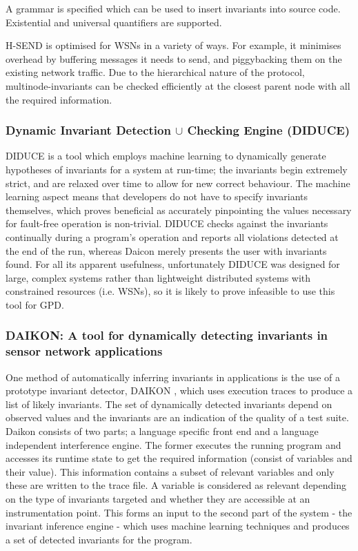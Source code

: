 A grammar is specified which can be used to insert invariants into source code. Existential and universal quantifiers are supported.

H-SEND is optimised for WSNs in a variety of ways. For example, it minimises overhead by buffering messages it needs to send, and piggybacking them on the existing network traffic. Due to the hierarchical nature of the protocol, multinode-invariants can be checked efficiently at the closest parent node with all the required information.

\subsubsection*{Dynamic Invariant Detection $\cup$ Checking Engine (DIDUCE)}

DIDUCE \cite{diduce} is a tool which employs machine learning to dynamically generate hypotheses of invariants for a system at run-time; the invariants begin extremely strict, and are relaxed over time to allow for new correct behaviour. The machine learning aspect means that developers do not have to specify invariants themselves, which proves beneficial as accurately pinpointing the values necessary for fault-free operation is non-trivial. DIDUCE checks against the invariants continually during a program's operation and reports all violations detected at the end of the run, whereas Daicon merely presents the user with invariants found. For all its apparent usefulness, unfortunately DIDUCE was designed for large, complex systems rather than lightweight distributed systems with constrained resources (i.e. WSNs), so it is likely to prove infeasible to use this tool for GPD.

\subsubsection*{DAIKON: A tool for dynamically detecting invariants in sensor network applications}

One method of automatically inferring invariants in applications is the use of a prototype invariant detector, DAIKON \cite{daikon}, which uses execution traces to produce a list of likely invariants. The set of dynamically detected invariants depend on observed values and the invariants are an indication of the quality of a test suite. Daikon consists of two parts; a language specific front end and a language independent interference engine. The former executes the running program and accesses its runtime state to get the required information (consist of variables and their value). This information contains a subset of relevant variables and only these are written to the trace file. A variable is considered as relevant depending on the type of invariants targeted and whether they are accessible at an instrumentation point. This forms an input to the second part of the system - the invariant inference engine - which uses machine learning techniques and produces a set of detected invariants for the program.

